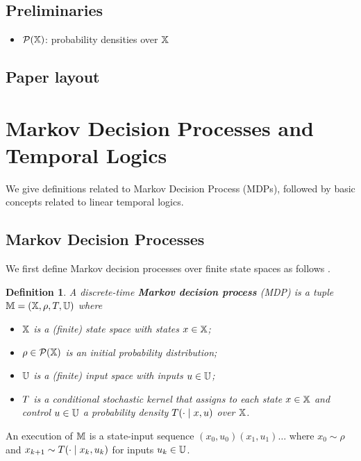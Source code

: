 \documentclass[conference]{IEEEtran}
\newtheorem{definition}{Definition}
\begin{document}
\subsection{Preliminaries}

\begin{itemize}
  \item $\mathcal P(\mathbb{X})$: probability densities over $\mathbb{X}$
\end{itemize}

\subsection{Paper layout}

\section{Markov Decision Processes and Temporal Logics}

We give definitions related to Markov Decision Process (MDPs), followed by basic concepts related to linear temporal logics.

\subsection{Markov Decision Processes}

We first define Markov decision processes over finite state spaces as follows \cite{hll1996}.
\begin{definition}
\label{def:MDP}
  A discrete-time \textbf{Markov decision process} (MDP) is a tuple $\mathbb{M} = (\mathbb{X}, \rho, T, \mathbb{U})$ where
  \begin{itemize}
    \item $\mathbb{X}$ is a (finite) state space with states $x\in\mathbb{X}$; %
    \item $\rho \in \mathcal P(\mathbb{X})$ is an initial probability distribution;
    \item $\mathbb{U}$ is a (finite) input space with inputs $u\in\mathbb{U}$;
    \item $T$ is a conditional stochastic kernel that assigns to each state $x\in \mathbb{X}$ and control $u\in \mathbb{U}$ a probability density $T(\cdot\mid x,u)$ over $\mathbb{X}$.
  \end{itemize}
\end{definition}

An execution of $\mathbb{M}$ is a state-input sequence $(x_0, u_0)(x_1, u_1)\ldots$ where $x_0 \sim \rho$ and $x_{k+1} \sim T(\cdot \mid x_k, u_k)$ for inputs $u_k \in \mathbb{U}$. 
\end{document}
